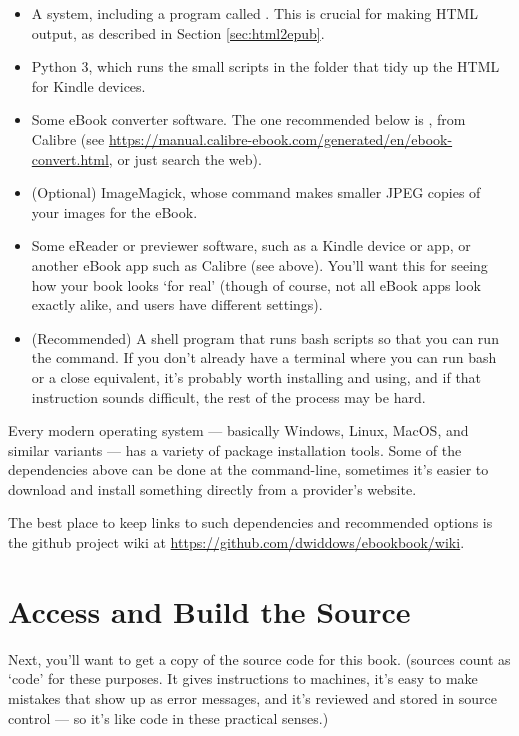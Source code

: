 \begin{itemize}
\item A \latex system, including a program called .
  This is crucial for making HTML output, as described in Section
  \ref{sec:html2epub}.
\item Python 3, which runs the small scripts in the  folder
  that tidy up the HTML for Kindle devices.
\item Some eBook converter software. The one recommended below is
  , from Calibre (see
  {\small \url{https://manual.calibre-ebook.com/generated/en/ebook-convert.html}}, or just
  search the web).
\item (Optional) ImageMagick, whose  command makes smaller
  JPEG copies of your images for the eBook.
\item Some eReader or previewer software, such as a Kindle device or
  app, or another eBook app such as Calibre (see above). You'll want
  this for seeing how your book looks `for real' (though of course,
  not all eBook apps look exactly alike, and users have different settings).
\item (Recommended) A shell program that runs bash scripts so that you
  can run the  command. If you don't already have a
  terminal where you can run bash or a close equivalent, it's probably
  worth installing and using, and if that instruction sounds
  difficult, the rest of the process may be hard.
\end{itemize}

Every modern operating system --- basically Windows, Linux, MacOS, and
similar variants --- has a variety of package installation tools.
Some of the dependencies above can be done at the command-line, sometimes it's
easier to download and install something directly from a provider's
website.

The best place to keep links to such dependencies and recommended options is the 
github project wiki at {\small \url{https://github.com/dwiddows/ebookbook/wiki}}.

\section{Access and Build the \latex Source}

Next, you'll want to get a copy of the source code for this
book. (\latex sources count as
`code' for these purposes. It gives instructions to machines, it's easy to make mistakes
that show up as error messages, and it's reviewed and stored in source
control --- so it's like code in these practical senses.)

